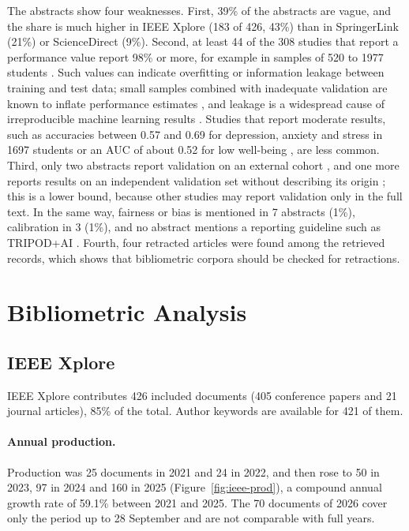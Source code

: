 \documentclass[11pt,a4paper]{article}
\begin{document}
The abstracts show four weaknesses. First, 39\% of the abstracts are vague, and the share is much higher in IEEE Xplore (183 of 426, 43\%) than in SpringerLink (21\%) or ScienceDirect (9\%). Second, at least 44 of the 308 studies that report a performance value report 98\% or more, for example in samples of 520 to 1977 students \cite{S009,S033,D073}. Such values can indicate overfitting or information leakage between training and test data; small samples combined with inadequate validation are known to inflate performance estimates \cite{vabalas2019validation}, and leakage is a widespread cause of irreproducible machine learning results \cite{kapoor2023leakage}. Studies that report moderate results, such as accuracies between 0.57 and 0.69 for depression, anxiety and stress in 1697 students \cite{S025} or an AUC of about 0.52 for low well-being \cite{I186}, are less common. Third, only two abstracts report validation on an external cohort \cite{S005,S021}, and one more reports results on an independent validation set without describing its origin \cite{I857}; this is a lower bound, because other studies may report validation only in the full text. In the same way, fairness or bias is mentioned in 7 abstracts (1\%), calibration in 3 (1\%), and no abstract mentions a reporting guideline such as TRIPOD+AI \cite{collins2024tripodai}. Fourth, four retracted articles were found among the retrieved records, which shows that bibliometric corpora should be checked for retractions.

\section{Bibliometric Analysis}\label{sec:biblio}

\subsection{IEEE Xplore}

IEEE Xplore contributes 426 included documents (405 conference papers and 21 journal articles), 85\% of the total. Author keywords are available for 421 of them.

\paragraph{Annual production.} Production was 25 documents in 2021 and 24 in 2022, and then rose to 50 in 2023, 97 in 2024 and 160 in 2025 (Figure~\ref{fig:ieee-prod}), a compound annual growth rate of 59.1\% between 2021 and 2025. The 70 documents of 2026 cover only the period up to 28 September and are not comparable with full years.
\end{document}

